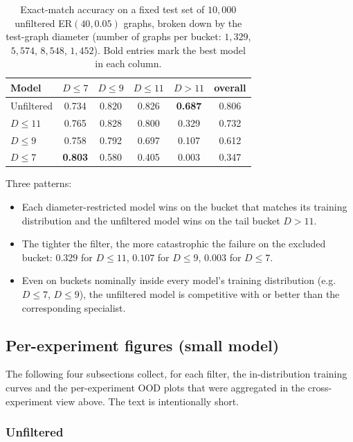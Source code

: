 \documentclass[11pt,a4paper]{article}
\begin{document}
\begin{table}[H]
\centering
\begin{tabular}{lccccc}
\toprule
Model       & $D \le 7$ & $D \le 9$ & $D \le 11$ & $D > 11$ & overall \\
\midrule
Unfiltered  & 0.734 & 0.820 & 0.826 & \textbf{0.687} & 0.806 \\
$D \le 11$  & 0.765 & 0.828 & 0.800 & 0.329 & 0.732 \\
$D \le 9$   & 0.758 & 0.792 & 0.697 & 0.107 & 0.612 \\
$D \le 7$   & \textbf{0.803} & 0.580 & 0.405 & 0.003 & 0.347 \\
\bottomrule
\end{tabular}
\caption{Exact-match accuracy on a fixed test set of $10{,}000$
unfiltered ER$(40, 0.05)$ graphs, broken down by the test-graph diameter
(number of graphs per bucket: $1{,}329$, $5{,}574$, $8{,}548$, $1{,}452$).
Bold entries mark the best model in each column.}
\label{tab:ood-er-buckets-small}
\end{table}

Three patterns:
\begin{itemize}
    \item Each diameter-restricted model wins on the bucket that matches its
          training distribution and the unfiltered model wins on the
          tail bucket $D > 11$.
    \item The tighter the filter, the more catastrophic the failure on the
          excluded bucket: $0.329$ for $D \le 11$, $0.107$ for $D \le 9$,
          $0.003$ for $D \le 7$.
    \item Even on buckets nominally inside every model's training
          distribution (e.g.\ $D \le 7$, $D \le 9$), the unfiltered model
          is competitive with or better than the corresponding specialist.
\end{itemize}

\subsection{Per-experiment figures (small model)}

The following four subsections collect, for each filter, the in-distribution
training curves and the per-experiment OOD plots that were aggregated in
the cross-experiment view above. The text is intentionally short.

\subsubsection{Unfiltered}
\end{document}
